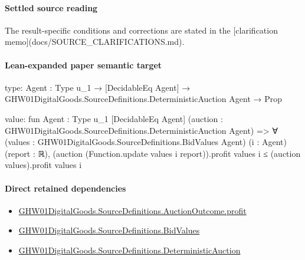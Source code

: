 \documentclass[10pt]{article}
\begin{document}
\paragraph{Settled source reading}
\begin{sloppypar}
The result-\allowbreak{}specific conditions and corrections are stated in the [clarification memo](docs/\allowbreak{}SOURCE\_\allowbreak{}CLARIFICATIONS.\allowbreak{}md).\allowbreak{}
\end{sloppypar}

\paragraph{Lean-expanded paper semantic target}
\begin{ReviewVerbatim}
type:
{Agent : Type u_1} → [DecidableEq Agent] → GHW01DigitalGoods.SourceDefinitions.DeterministicAuction Agent → Prop

value:
fun {Agent : Type u_1} [DecidableEq Agent] (auction : GHW01DigitalGoods.SourceDefinitions.DeterministicAuction Agent) =>
  ∀ (values : GHW01DigitalGoods.SourceDefinitions.BidValues Agent) (i : Agent) (report : ℝ),
    (auction (Function.update values i report)).profit values i ≤ (auction values).profit values i
\end{ReviewVerbatim}

\paragraph{Direct retained dependencies}
\begin{itemize}\raggedright
\item \hyperlink{paper-prerequisite-db537f75b83ffab9}{GHW01\allowbreak{}Digital\allowbreak{}Goods.\allowbreak{}Source\allowbreak{}Definitions.\allowbreak{}Auction\allowbreak{}Outcome.\allowbreak{}profit}
\item \hyperlink{paper-prerequisite-64512d0878f162c7}{GHW01\allowbreak{}Digital\allowbreak{}Goods.\allowbreak{}Source\allowbreak{}Definitions.\allowbreak{}Bid\allowbreak{}Values}
\item \hyperlink{paper-prerequisite-71190db14f40c12d}{GHW01\allowbreak{}Digital\allowbreak{}Goods.\allowbreak{}Source\allowbreak{}Definitions.\allowbreak{}Deterministic\allowbreak{}Auction}
\end{itemize}
\end{document}

